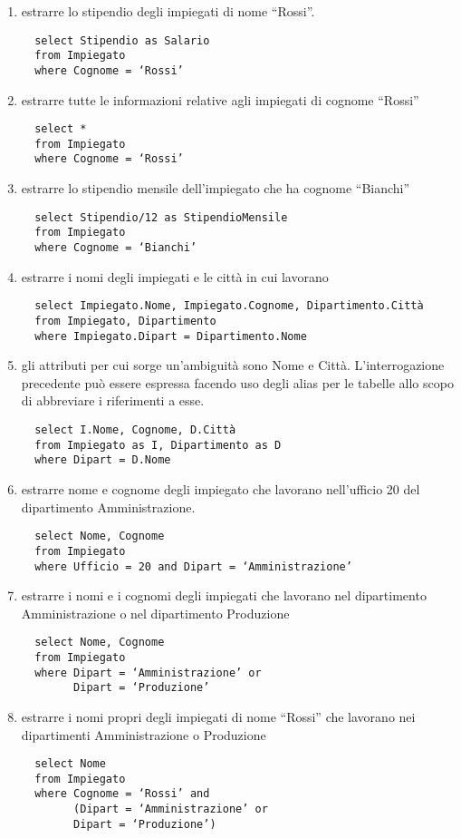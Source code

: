 \documentclass[a4paper]{article}
\begin{document}
\begin{enumerate}
  \item estrarre lo stipendio degli impiegati di nome “Rossi”.
  \begin{verbatim}
  select Stipendio as Salario
  from Impiegato
  where Cognome = ‘Rossi’
  \end{verbatim}

  \item estrarre tutte le informazioni relative agli impiegati di cognome “Rossi”
  \begin{verbatim}
  select *
  from Impiegato
  where Cognome = ‘Rossi’
  \end{verbatim}

  \item estrarre lo stipendio mensile dell’impiegato che ha cognome “Bianchi”
  \begin{verbatim}
  select Stipendio/12 as StipendioMensile
  from Impiegato
  where Cognome = ‘Bianchi’
  \end{verbatim}

  \item estrarre i nomi degli impiegati e le città in cui lavorano
  \begin{verbatim}
  select Impiegato.Nome, Impiegato.Cognome, Dipartimento.Città
  from Impiegato, Dipartimento
  where Impiegato.Dipart = Dipartimento.Nome
  \end{verbatim}

  \item gli attributi per cui sorge un'ambiguità sono Nome e Città. L'interrogazione precedente può essere espressa facendo uso degli alias per le tabelle allo scopo di abbreviare i riferimenti a esse.
  \begin{verbatim}
  select I.Nome, Cognome, D.Città
  from Impiegato as I, Dipartimento as D
  where Dipart = D.Nome
  \end{verbatim}

  \item estrarre nome e cognome degli impiegato che lavorano nell’ufficio 20 del dipartimento Amministrazione.
  \begin{verbatim}
  select Nome, Cognome
  from Impiegato
  where Ufficio = 20 and Dipart = ‘Amministrazione’
  \end{verbatim}

  \item estrarre i nomi e i cognomi degli impiegati che lavorano nel dipartimento Amministrazione o nel dipartimento Produzione
  \begin{verbatim}
  select Nome, Cognome
  from Impiegato
  where Dipart = ‘Amministrazione’ or
        Dipart = ‘Produzione’
  \end{verbatim}

  \item estrarre i nomi propri degli impiegati di nome “Rossi” che lavorano nei dipartimenti Amministrazione o Produzione
  \begin{verbatim}
  select Nome
  from Impiegato
  where Cognome = ‘Rossi’ and
        (Dipart = ‘Amministrazione’ or
        Dipart = ‘Produzione’)
  \end{verbatim}
\end{enumerate}
\end{document}
